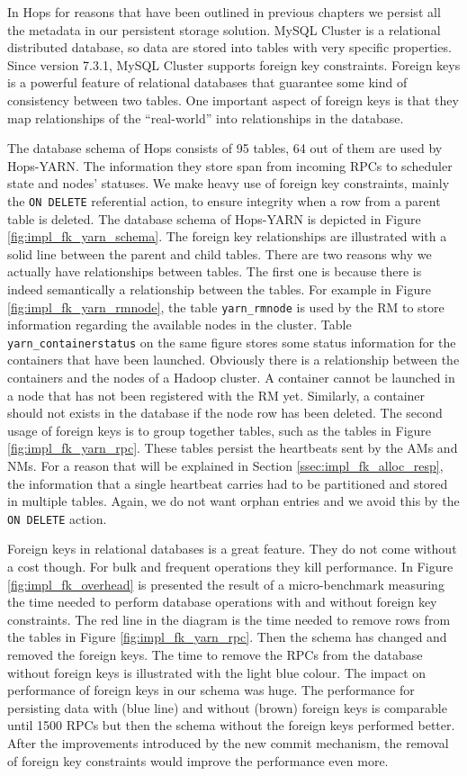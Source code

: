 In Hops for reasons that have been outlined in previous chapters we
persist all the metadata in our persistent storage solution. MySQL
Cluster is a relational distributed database, so data are stored into
tables with very specific properties. Since version 7.3.1, MySQL
Cluster supports foreign key constraints. Foreign keys is a powerful
feature of relational databases that guarantee some kind of
consistency between two tables. One important aspect of foreign keys
is that they map relationships of the ``real-world'' into
relationships in the database.

The database schema of Hops consists of 95 tables, 64 out of them are
used by Hops-YARN. The information they store span from incoming RPCs
to scheduler state and nodes' statuses. We make heavy use of foreign
key constraints, mainly the \texttt{ON DELETE} referential action, to
ensure integrity when a row from a parent table is deleted. The
database schema of Hops-YARN is depicted in Figure
\ref{fig:impl_fk_yarn_schema}. The foreign key relationships
are illustrated with a solid line between the parent and child tables.
There are two reasons why we actually have relationships
between tables. The first one is because there is indeed semantically a
relationship between the tables. For example in Figure
\ref{fig:impl_fk_yarn_rmnode}, the table \texttt{yarn\_rmnode} is used by
the RM to store information regarding the available nodes in
the cluster. Table \texttt{yarn\_containerstatus} on the same figure
stores some status information for the containers that have been
launched. Obviously there is a relationship between the containers and
the nodes of a Hadoop cluster. A container cannot be launched in a
node that has not been registered with the RM yet. Similarly,
a container should not exists in the database if the node row has been
deleted. The second usage of foreign keys is to group together tables,
such as the tables in Figure \ref{fig:impl_fk_yarn_rpc}. These tables
persist the heartbeats sent by the AMs and NMs. For a reason that will
be explained in Section \ref{ssec:impl_fk_alloc_resp}, the information that a
single heartbeat carries had to be partitioned and stored in multiple
tables. Again, we do not want orphan entries and we avoid this by the
\texttt{ON DELETE} action.

Foreign keys in relational databases is a great feature. They do not
come without a cost though. For bulk and frequent operations they kill
performance. In Figure \ref{fig:impl_fk_overhead} is presented the
result of a micro-benchmark measuring the time needed to perform
database operations with and without foreign key constraints. The red
line in the diagram is the time needed to remove rows from the tables in Figure
\ref{fig:impl_fk_yarn_rpc}. Then the schema has changed and removed
the foreign keys. The time to remove the RPCs from the database
without foreign keys is illustrated with the light blue colour. The impact
on performance of foreign keys in our schema was huge. The performance
for persisting data with (blue line) and without (brown) foreign keys
is comparable until 1500 RPCs but then the schema without the foreign
keys performed better. After the improvements introduced by the new
commit mechanism, the removal of foreign key constraints would improve
the performance even more.

